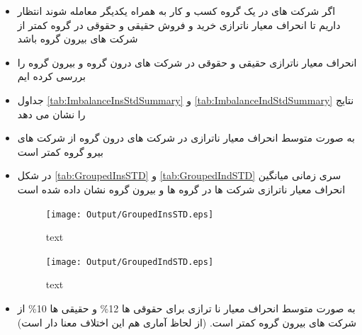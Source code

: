 \documentclass[12pt, a4paper]{article}
\begin{document}
 \begin{itemize}
 	\item 
 	اگر شرکت های در یک گروه کسب و کار به همراه یکدیگر معامله شوند انتظار داریم تا انحراف معیار ناترازی خرید و فروش حقیقی و حقوقی در گروه کمتر از شرکت های بیرون گروه باشد
 	\item 
 	انحراف معیار ناترازی حقیقی و حقوقی در شرکت های درون گروه و بیرون گروه را بررسی کرده ایم
 		\item 
 	جداول 
 		\ref{tab:ImbalanceInsStdSummary}
 	و
 	\ref{tab:ImbalanceIndStdSummary}
 	نتایج را نشان می دهد
 	\begin{LTR}
 	\end{LTR}
 	\begin{LTR}
 		\lr{\begin{table}[htbp]
 				\centering
 				\caption{text}
 				\resizebox{0.75\textwidth}{!}{
 					
 				}
 				\label{tab:ImbalanceIndStdSummary}
 		\end{table}}
 	\end{LTR}
 		\item 
 	به صورت متوسط انحراف معیار ناترازی در شرکت های درون گروه از شرکت های بیرو گروه کمتر است	
 	
 	\item 
 	در شکل 
 	\ref{tab:GroupedInsSTD}
 	و
 	\ref{tab:GroupedIndSTD}
 	سری زمانی میانگین انحراف معیار ناترازی شرکت ها در گروه ها و بیرون گروه نشان داده شده است
 	\begin{figure}[htbp]
 		\centering
 		\caption{text}
 		\texttt{[image: Output/GroupedInsSTD.eps]}
 		\label{fig:GroupedInsSTD}
 	\end{figure}
 	\begin{figure}[htbp]
 		\centering
 		\caption{text}
 		\texttt{[image: Output/GroupedIndSTD.eps]}
 		\label{fig:GroupedIndSTD}
 	\end{figure}
 	\item 
 	به صورت متوسط انحراف معیار نا ترازی برای حقوقی ها 12\%
 	و حقیقی ها 10\% از شرکت های بیرون گروه کمتر است. (از لحاظ آماری هم این اختلاف معنا دار است)
 	
 \end{itemize}
  
\end{document}
